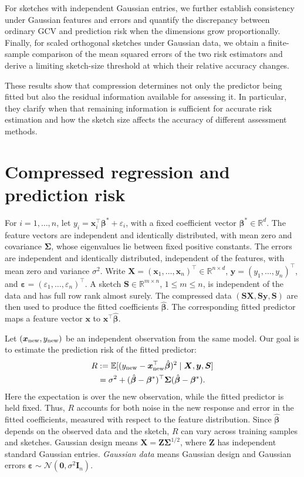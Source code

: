 \documentclass{article}
\theoremstyle{plain}
\theoremstyle{definition}
\theoremstyle{definition}
\newcommand{\boldzero}{\mathbf{0}}
\def\R{{\mathbb{R}}}
\def\E{{\mathbb{E}}}
\def\mathbold{\boldsymbol}
\def\cal{\mathcal}
\def\bI{\mathbold{I}}\def\hbI{{\widehat{\bI}}}\def\tbI{{\widetilde{\bI}}}
\def\calN{{\cal N}}\def\scrN{{\mathscr N}}\def\Nhat{\widehat{N}}\def\Ntil{{\widetilde N}}\def\Nbar{{\overline N}}
\def\bS{\mathbold{S}}\def\hbS{{\widehat{\bS}}}\def\tbS{{\widetilde{\bS}}}
\def\bx{\mathbold{x}}\def\xhat{\widehat{x}}\def\xtil{\widetilde{x}}\def\xbar{{\overline x}}\def\vbx{{\bf x}}
\def\bX{\mathbold{X}}\def\hbX{{\widehat{\bX}}}\def\tbX{{\tilde{\bX}}}\def\bXbar{{\overline \bX}}
\def\by{\mathbold{y}}\def\yhat{\widehat{y}}\def\ytil{\widetilde{y}}\def\ybar{{\overline y}}\def\vby{{\bf y}}
\def\bZ{\mathbold{Z}}\def\hbZ{{\widehat{\bZ}}}\def\tbZ{{\widetilde{\bZ}}}
\def\bbeta{\mathbold{\beta}}\def\betahat{\widehat{\beta}}\def\hbeta{\widehat{\beta}}
\def\hbbeta{\hat{\bbeta}{}}
\def\ep{\varepsilon}\def\eps{\epsilon}\def\veps{\varepsilon}
\def\bep{ {\mathbold{\ep} }}
\def\bSigma{\mathbold{\Sigma}}\def\hbSigma{{\widehat{\bSigma}}}
\begin{document}
For sketches with independent Gaussian entries, we further establish consistency under Gaussian features and errors and quantify the discrepancy between ordinary GCV and prediction risk when the dimensions grow proportionally. Finally, for scaled orthogonal sketches under Gaussian data, we obtain a finite-sample comparison of the mean squared errors of the two risk estimators and derive a limiting sketch-size threshold at which their relative accuracy changes.

These results show that compression determines not only the predictor being fitted but also the residual information available for assessing it. In particular, they clarify when that remaining information is sufficient for accurate risk estimation and how the sketch size affects the accuracy of different assessment methods.


\section{Compressed regression and prediction risk}
\label{sec:meth}

For $i=1,\ldots,n$, let
$y_i=\bx_i^\top\bbeta^*+\varepsilon_i$, with a fixed coefficient vector
$\bbeta^*\in\R^d$. The feature vectors are independent and identically
distributed, with mean zero and covariance $\bSigma$, whose eigenvalues
lie between fixed positive constants. The errors are independent and
identically distributed, independent of the features, with mean zero and
variance $\sigma^2$. Write
$\bX=(\bx_1,\ldots,\bx_n)^\top\in\R^{n\times d}$,
$\by=(y_1,\ldots,y_n)^\top$, and
$\bep=(\varepsilon_1,\ldots,\varepsilon_n)^\top$.
A sketch $\bS\in\R^{m\times n}$, $1\leq m\leq n$, is independent of the
data and has full row rank almost surely. The compressed data
$(\bS\bX,\bS\by,\bS)$ are then used to produce the fitted coefficients
$\hbbeta$. The corresponding fitted predictor maps a feature vector
$\bx$ to $\bx^\top\hbbeta$.

Let $(\bx_{\rm new},y_{\rm new})$ be an independent observation from
the same model. Our goal is to estimate the prediction risk of the
fitted predictor:
\begin{align}
 R&:=\E[(y_{\rm new}-\bx_{\rm new}^\top\hbbeta)^2
             \mid\bX,\by,\bS]\notag\\
  &=\sigma^2+(\hbbeta-\bbeta^*)^\top\bSigma(\hbbeta-\bbeta^*).
 \label{eq:cpal-prediction-risk}
\end{align}
Here the expectation is over the new observation, while the fitted
predictor is held fixed. Thus, $R$ accounts for both noise in the new
response and error in the fitted coefficients, measured with respect to
the feature distribution. Since $\hbbeta$ depends on the observed data
and the sketch, $R$ can vary across training samples and sketches.
Gaussian design means $\bX=\bZ\bSigma^{1/2}$, where $\bZ$ has independent
standard Gaussian entries. \emph{Gaussian data} means Gaussian design
and Gaussian errors $\bep\sim\calN(\boldzero,\sigma^2\bI_n)$.
\end{document}
